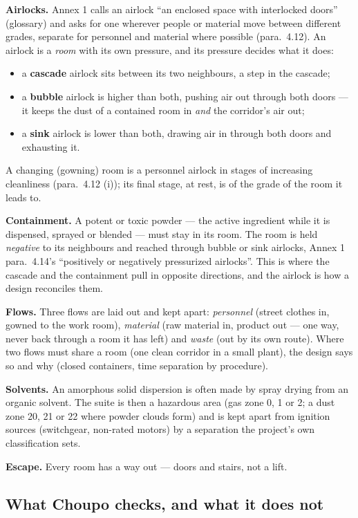 \documentclass[11pt,a4paper]{article}
\providecommand{\tightlist}{\setlength{\itemsep}{0pt}\setlength{\parskip}{0pt}}
\begin{document}
\textbf{Airlocks.} Annex 1 calls an airlock ``an enclosed space with
interlocked doors'' (glossary) and asks for one wherever people or
material move between different grades, separate for personnel and
material where possible (para.~4.12). An airlock is a \emph{room} with
its own pressure, and its pressure decides what it does:
\begin{itemize}
\tightlist
\item
  a \textbf{cascade} airlock sits between its two neighbours, a step in
  the cascade;
\item
  a \textbf{bubble} airlock is higher than both, pushing air out through
  both doors --- it keeps the dust of a contained room in \emph{and} the
  corridor's air out;
\item
  a \textbf{sink} airlock is lower than both, drawing air in through
  both doors and exhausting it.
\end{itemize}
A changing (gowning) room is a personnel airlock in stages of increasing
cleanliness (para.~4.12 (i)); its final stage, at rest, is of the grade
of the room it leads to.

\textbf{Containment.} A potent or toxic powder --- the active
ingredient while it is dispensed, sprayed or blended --- must stay in its
room. The room is held \emph{negative} to its neighbours and reached
through bubble or sink airlocks, Annex 1 para.~4.14's
``positively or negatively pressurized airlocks''. This is where the
cascade and the containment pull in opposite directions, and the airlock
is how a design reconciles them.

\textbf{Flows.} Three flows are laid out and kept apart: \emph{personnel}
(street clothes in, gowned to the work room), \emph{material} (raw
material in, product out --- one way, never back through a room it has
left) and \emph{waste} (out by its own route). Where two flows must share
a room (one clean corridor in a small plant), the design says so and why
(closed containers, time separation by procedure).

\textbf{Solvents.} An amorphous solid dispersion is often made by spray
drying from an organic solvent. The suite is then a hazardous area (gas
zone 0, 1 or 2; a dust zone 20, 21 or 22 where powder clouds form) and is
kept apart from ignition sources (switchgear, non-rated motors) by a
separation the project's own classification sets.

\textbf{Escape.} Every room has a way out --- doors and stairs, not a
lift.

\hypertarget{what-choupo-checks-in-the-gmp-interior}{%
\subsection{What Choupo checks, and what it does
not}\label{what-choupo-checks-in-the-gmp-interior}}
\end{document}
